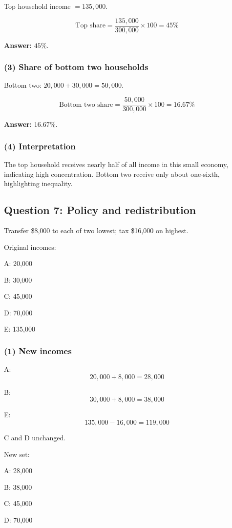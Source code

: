 \documentclass[11pt]{article}
\begin{document}
Top household income \(=135{,}000\).

\[
\text{Top share}=\frac{135{,}000}{300{,}000}\times 100=45\%
\]

\textbf{Answer:} \(45\%\).

\subsubsection*{(3) Share of bottom two households}

Bottom two: \(20{,}000+30{,}000=50{,}000\).

\[
\text{Bottom two share}=\frac{50{,}000}{300{,}000}\times 100=16.67\%
\]

\textbf{Answer:} \(16.67\%\).

\subsubsection*{(4) Interpretation}

The top household receives nearly half of all income in this small economy, indicating high concentration. Bottom two receive only about one-sixth, highlighting inequality.

\subsection*{Question 7: Policy and redistribution}

Transfer \$8,000 to each of two lowest; tax \$16,000 on highest.

Original incomes:

A: 20,000

B: 30,000

C: 45,000

D: 70,000

E: 135,000
\newpage
\subsubsection*{(1) New incomes}

A:
\[
20{,}000+8{,}000=28{,}000
\]

B:
\[
30{,}000+8{,}000=38{,}000
\]

E:
\[
135{,}000-16{,}000=119{,}000
\]

C and D unchanged.

New set:

A: 28,000

B: 38,000

C: 45,000

D: 70,000
\end{document}
